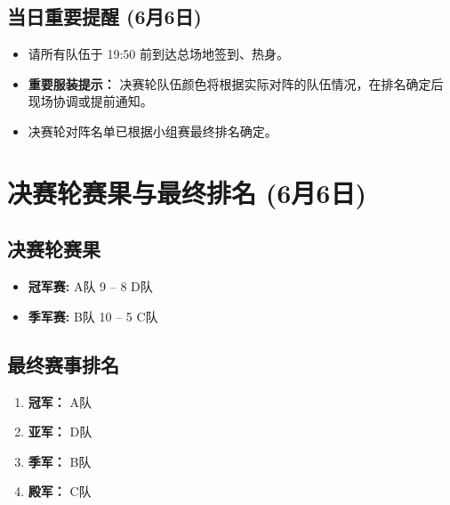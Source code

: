 \documentclass{ctexart}
\begin{document}
\subsection*{当日重要提醒 (6月6日)}
\begin{itemize}
    \item 请所有队伍于 19:50 前到达总场地签到、热身。
    \item \textbf{重要服装提示：} 决赛轮队伍颜色将根据实际对阵的队伍情况，在排名确定后现场协调或提前通知。
    \item 决赛轮对阵名单已根据小组赛最终排名确定。
\end{itemize}

\newpage %

\section{决赛轮赛果与最终排名 (6月6日)}

\subsection*{决赛轮赛果}
\begin{itemize}
    \item \textbf{冠军赛:} A队 9 -- 8 D队
    \item \textbf{季军赛:} B队 10 -- 5 C队
\end{itemize}

\subsection*{最终赛事排名}
\begin{enumerate}
    \item \textbf{冠军：} A队
    \item \textbf{亚军：} D队
    \item \textbf{季军：} B队
    \item \textbf{殿军：} C队
\end{enumerate}
\end{document}
